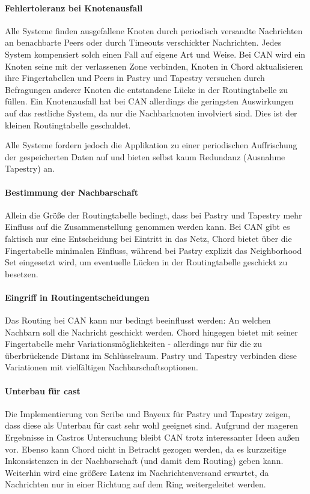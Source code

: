 \paragraph{Fehlertoleranz bei Knotenausfall}
Alle Systeme finden ausgefallene Knoten durch periodisch versandte Nachrichten an benachbarte Peers oder durch Timeouts verschickter Nachrichten. Jedes System kompensiert solch einen Fall auf eigene Art und Weise. Bei CAN wird ein Knoten seine mit der verlassenen Zone verbinden, Knoten in Chord aktualisieren ihre Fingertabellen und Peers in Pastry und Tapestry versuchen durch Befragungen anderer Knoten die entstandene Lücke in der Routingtabelle zu füllen. Ein Knotenausfall hat bei CAN allerdings die geringsten Auswirkungen auf das restliche System, da nur die Nachbarknoten involviert sind. Dies ist der kleinen Routingtabelle geschuldet.

Alle Systeme fordern jedoch die Applikation zu einer periodischen Auffrischung der gespeicherten Daten auf und bieten selbst kaum Redundanz (Ausnahme Tapestry) an.


\paragraph{Bestimmung der Nachbarschaft}
Allein die Größe der Routingtabelle bedingt, dass bei Pastry und Tapestry mehr Einfluss auf die Zusammenstellung genommen werden kann. Bei CAN gibt es faktisch nur eine Entscheidung bei Eintritt in das Netz, Chord bietet über die Fingertabelle minimalen Einfluss, während bei Pastry explizit das Neighborhood Set eingesetzt wird, um eventuelle Lücken in der Routingtabelle geschickt zu besetzen.

\paragraph{Eingriff in Routingentscheidungen}
Das Routing bei CAN kann nur bedingt beeinflusst werden: An welchen Nachbarn soll die Nachricht geschickt werden. Chord hingegen bietet mit seiner Fingertabelle mehr Variationsmöglichkeiten - allerdings nur für die zu überbrückende Distanz im Schlüsselraum. Pastry und Tapestry verbinden diese Variationen mit vielfältigen Nachbarschaftsoptionen.

\paragraph{Unterbau für \ac{cast}}
Die Implementierung von Scribe und Bayeux für Pastry und Tapestry zeigen, dass diese als Unterbau für \ac{cast} sehr wohl geeignet sind. Aufgrund der mageren Ergebnisse in Castros Untersuchung \cite{Castro2003Evaluation} bleibt CAN trotz interessanter Ideen außen vor. Ebenso kann Chord nicht in Betracht gezogen werden, da es kurzzeitige Inkonsistenzen in der Nachbarschaft (und damit dem Routing) geben kann. Weiterhin wird eine größere Latenz im Nachrichtenversand erwartet, da Nachrichten nur in einer Richtung auf dem Ring weitergeleitet werden.

